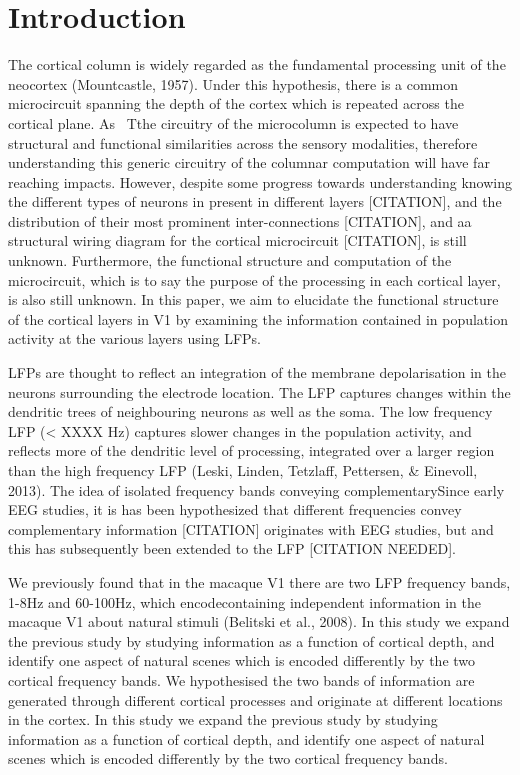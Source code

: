 \section{Introduction}
The cortical column is widely regarded as the fundamental processing unit of the neocortex (Mountcastle, 1957).
Under this hypothesis, there is a common microcircuit spanning the depth of the cortex which is repeated across the cortical plane.
As \ Tthe circuitry of the microcolumn is expected to have structural and functional similarities across the sensory modalities, therefore understanding this generic circuitry of the columnar computation will have far reaching impacts.
However, despite some progress towards understanding knowing the different types of neurons in present in different layers [CITATION], and the distribution of their most prominent inter-connections [CITATION], and aa structural wiring diagram for the cortical microcircuit [CITATION], is still unknown.
Furthermore, the functional structure and computation of the microcircuit, which is to say the purpose of the processing in each cortical layer, is also still unknown.
In this paper, we aim to elucidate the functional structure of the cortical layers in \ac{V1} by examining the information contained in population activity at the various layers using \acp{LFP}.

\acp{LFP} are thought to reflect an integration of the membrane depolarisation in the neurons surrounding the electrode location.
The \ac{LFP} captures changes within the dendritic trees of neighbouring neurons as well as the soma.
The low frequency \ac{LFP} ({\textless} XXXX Hz) captures slower changes in the population activity, and reflects more of the dendritic level of processing, integrated over a larger region than the high frequency \ac{LFP} (Leski, Linden, Tetzlaff, Pettersen, \& Einevoll, 2013).
The idea of isolated frequency bands conveying complementarySince early \ac{EEG} studies, it is has been hypothesized that different frequencies convey complementary information [CITATION] originates with \ac{EEG} studies, but and this has subsequently been extended to the \ac{LFP} [CITATION NEEDED].


We previously found that in the macaque \ac{V1} there are two \ac{LFP} frequency bands, 1-8Hz and 60-100Hz, which encodecontaining independent information in the macaque \ac{V1} about natural stimuli (Belitski et al., 2008).
In this study we expand the previous study by studying information as a function of cortical depth, and identify one aspect of natural scenes which is encoded differently by the two cortical frequency bands.
We hypothesised the two bands of information are generated through different cortical processes and originate at different locations in the cortex.
In this study we expand the previous study by studying information as a function of cortical depth, and identify one aspect of natural scenes which is encoded differently by the two cortical frequency bands.

